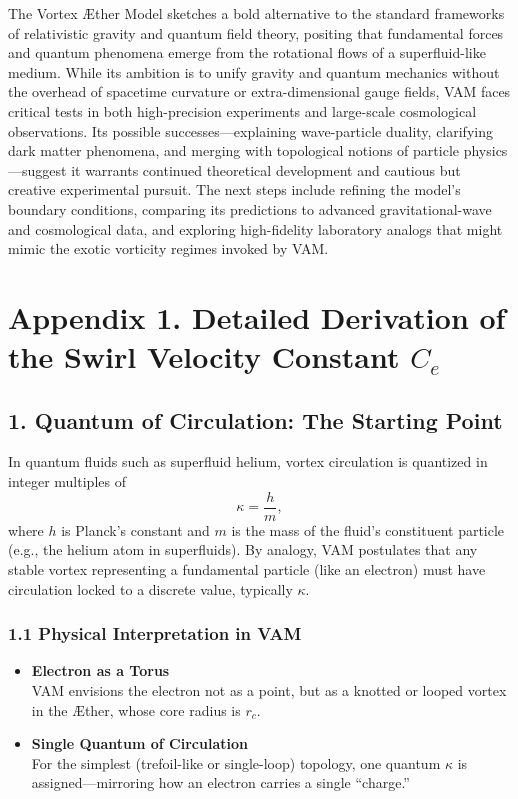 \documentclass[aps,preprint,superscriptaddress]{revtex4-2}
\begin{document}
    The Vortex Æther Model sketches a bold alternative to the standard frameworks of relativistic gravity and quantum field theory, positing that fundamental forces and quantum phenomena emerge from the rotational flows of a superfluid-like medium. While its ambition is to unify gravity and quantum mechanics without the overhead of spacetime curvature or extra-dimensional gauge fields, VAM faces critical tests in both high-precision experiments and large-scale cosmological observations. Its possible successes—explaining wave-particle duality, clarifying dark matter phenomena, and merging with topological notions of particle physics—suggest it warrants continued theoretical development and cautious but creative experimental pursuit. The next steps include refining the model’s boundary conditions, comparing its predictions to advanced gravitational-wave and cosmological data, and exploring high-fidelity laboratory analogs that might mimic the exotic vorticity regimes invoked by VAM.


    
    

    \appendix


    \section*{Appendix 1. Detailed Derivation of the Swirl Velocity Constant \(C_e\)}

    \subsection*{1. Quantum of Circulation: The Starting Point}

    In quantum fluids such as superfluid helium, vortex circulation is quantized in integer multiples of
    \[
        \kappa = \frac{h}{m},
    \]
    where \(h\) is Planck’s constant and \(m\) is the mass of the fluid’s constituent particle (e.g., the helium atom in superfluids). By analogy, VAM postulates that any stable vortex representing a fundamental particle (like an electron) must have circulation locked to a discrete value, typically \(\kappa\).

    \subsubsection*{1.1 Physical Interpretation in VAM}
    \begin{itemize}
        \item \textbf{Electron as a Torus} \\
    VAM envisions the electron not as a point, but as a knotted or looped vortex in the Æther, whose core radius is \(r_c\).
        \item \textbf{Single Quantum of Circulation} \\
    For the simplest (trefoil-like or single-loop) topology, one quantum \(\kappa\) is assigned—mirroring how an electron carries a single “charge.”
    \end{itemize}
\end{document}
